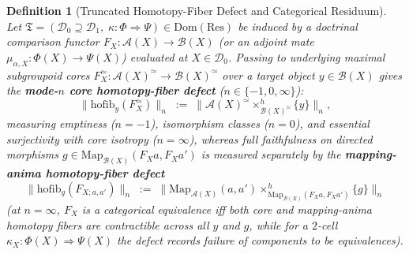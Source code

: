 \documentclass[10pt,twoside,openright]{book}
\theoremstyle{crmplain}
\theoremstyle{crmdef}
\newtheorem{definition}[theorem]{Definition}
\theoremstyle{crmremark}
\begin{document}
\begin{definition}[Truncated Homotopy-Fiber Defect and Categorical Residuum]\label{def:residuum}%
%
Let $\mathfrak{T} = (\mathcal{D}_0 \supseteq \mathcal{D}_1, \; \kappa : \Phi \Longrightarrow \Psi) \in \mathrm{Dom}(\mathrm{Res})$ be induced by a doctrinal comparison functor $F_X : \mathcal{A}(X) \to \mathcal{B}(X)$ (or an adjoint mate $\mu_{\alpha, X} : \Phi(X) \to \Psi(X)$) evaluated at $X \in \mathcal{D}_0$. Passing to underlying maximal subgroupoid cores $F_X^{\simeq} : \mathcal{A}(X)^{\simeq} \to \mathcal{B}(X)^{\simeq}$ over a target object $y \in \mathcal{B}(X)$ gives the \textbf{mode-$n$ core homotopy-fiber defect} ($n \in \{-1, 0, \infty\}$):
\[
  \bigl\|\mathrm{hofib}_y(F_X^{\simeq})\bigr\|_n \;:=\; \bigl\|\mathcal{A}(X)^{\simeq} \times^h_{\mathcal{B}(X)^{\simeq}} \{y\}\bigr\|_n,
\]
measuring emptiness ($n = -1$), isomorphism classes ($n = 0$), and essential surjectivity with core isotropy ($n = \infty$), whereas full faithfulness on directed morphisms $g \in \mathrm{Map}_{\mathcal{B}(X)}(F_X a, F_X a')$ is measured separately by the \textbf{mapping-anima homotopy-fiber defect}
\[
  \bigl\|\mathrm{hofib}_g(F_{X; a,a'})\bigr\|_n \;:=\; \bigl\|\mathrm{Map}_{\mathcal{A}(X)}(a, a') \times^h_{\mathrm{Map}_{\mathcal{B}(X)}(F_X a, F_X a')} \{g\}\bigr\|_n
\]
(at $n = \infty$, $F_X$ is a categorical equivalence iff both core and mapping-anima homotopy fibers are contractible across all $y$ and $g$, while for a $2$-cell $\kappa_X : \Phi(X) \Rightarrow \Psi(X)$ the defect records failure of components to be equivalences).


\end{definition}
\end{document}
